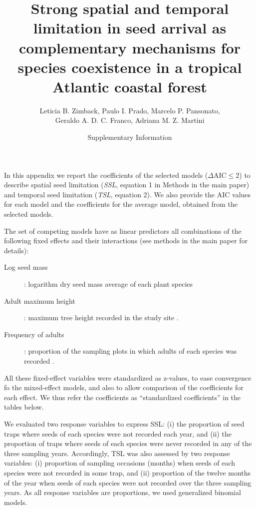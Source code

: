 \documentclass{article}
\begin{document}
\title{Strong spatial and temporal limitation in seed arrival as  complementary mechanisms for species coexistence in a tropical Atlantic coastal forest}


\author{Leticia B. Zimback, Paulo I. Prado, Marcelo P. Pansonato, \\ Geraldo A. D. C. Franco,  
Adriana M. Z. Martini}

\date{\Large Supplementary Information}

\maketitle


In this %
appendix
we report the coefficients of the selected models
($\Delta \mathrm{AIC} \leq 2$) to describe spatial seed limitation
(\emph{SSL}, equation 1 in Methods in the main paper) and temporal
seed limitation (\emph{TSL}, equation 2). We also provide the AIC
values for each model and the coefficients for the average model,
obtained from the selected models.


The set of competing models have as linear predictors all combinations
of the following fixed effects and their interactions (see methods in
the main paper for details):

\begin{description}
\item[Log seed mass]: logarithm dry seed mass average of each plant species
\item[Adult maximum height]:  maximum tree height recorded in the study site \cite{pansonato2018}.
\item[Frequency of adults]: proportion of the sampling plots in which adults of each species was recorded \cite{pansonato2018}. 
\end{description}

All these fixed-effect variables were standardized as z-values, to
ease convergence fo the mixed-effect models, and also to allow
comparison of the coefficients for each effect. We thus refer the
coefficients as ``standardized coefficients'' in the tables below.

We evaluated two response variables to express SSL: (i) the proportion
of seed traps where seeds of each species were not recorded each year,
and (ii) the proportion of traps where seeds of each species were
never recorded in any of the three sampling years. Accordingly, TSL
was also assessed by two response variables: (i) proportion of
sampling occasions (months) when seeds of each species were not
recorded in some trap, and (ii) proportion of the twelve months of the
year when seeds of each species were not recorded over the three
sampling years. As all response variables are proportions, we used
generalized binomial models.
\end{document}
